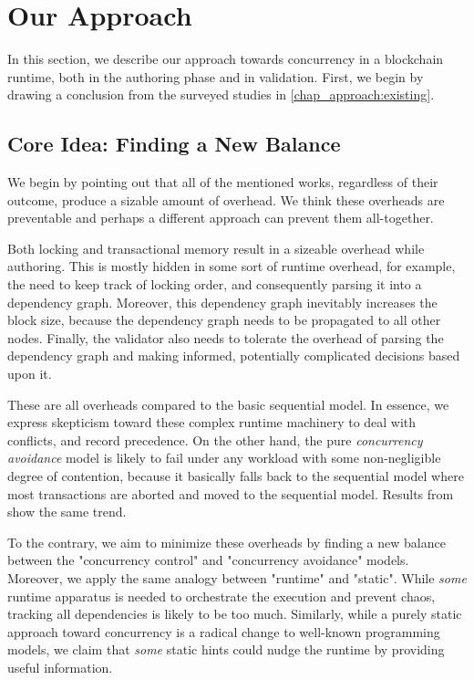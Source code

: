 \section{Our Approach} \label{chap_desgin:sec:our_approach}

In this section, we describe our approach towards concurrency in a blockchain runtime, both in the
authoring phase and in validation. First, we begin by drawing a conclusion from the surveyed studies
in \ref{chap_approach:existing}.

\subsection{Core Idea: Finding a New Balance}

We begin by pointing out that all of the mentioned works, regardless of their outcome, produce a
sizable amount of overhead. We think these overheads are preventable and perhaps a different
approach can prevent them all-together.

Both locking and transactional memory result in a sizeable overhead while authoring. This is mostly
hidden in some sort of runtime overhead, for example, the need to keep track of locking order, and
consequently parsing it into a dependency graph. Moreover, this dependency graph inevitably
increases the block size, because the dependency graph needs to be propagated to all other nodes.
Finally, the validator also needs to tolerate the overhead of parsing the dependency graph and
making informed, potentially complicated decisions based upon it.

These are all overheads compared to the basic sequential model. In essence, we express skepticism
toward these complex runtime machinery to deal with conflicts, and record precedence. On the other
hand, the pure \textit{concurrency avoidance} model is likely to fail under any workload with some
non-negligible degree of contention, because it basically falls back to the sequential model where
most transactions are aborted and moved to the sequential model. Results from
\cite{saraphEmpiricalStudySpeculative2019} show the same trend.

To the contrary, we aim to minimize these overheads by finding a new
balance between the "concurrency control" and "concurrency avoidance" models. Moreover, we apply the
same analogy between "runtime" and "static". While \textit{some} runtime apparatus is needed to
orchestrate the execution and prevent chaos, tracking all dependencies is likely to be too much.
Similarly, while a purely static approach toward concurrency is a radical change to well-known
programming models, we claim that \textit{some} static hints could nudge the runtime by providing
useful information.

